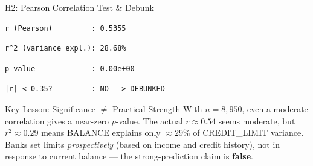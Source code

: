 \documentclass[
  ignorenonframetext,
  aspectratio=169]{beamer}
\newenvironment{Shaded}{\begin{snugshade}}{\end{snugshade}}
\newcommand{\AttributeTok}[1]{\textcolor[rgb]{0.13,0.29,0.53}{#1}}
\newcommand{\FunctionTok}[1]{\textcolor[rgb]{0.13,0.29,0.53}{\textbf{#1}}}
\newcommand{\NormalTok}[1]{#1}
\newcommand{\OtherTok}[1]{\textcolor[rgb]{0.56,0.35,0.01}{#1}}
\newcommand{\SpecialCharTok}[1]{\textcolor[rgb]{0.81,0.36,0.00}{\textbf{#1}}}
\newcommand{\StringTok}[1]{\textcolor[rgb]{0.31,0.60,0.02}{#1}}
\begin{document}
\begin{frame}[fragile]{H2: Pearson Correlation Test \& Debunk}
\protect{}\label{h2-pearson-correlation-test-debunk}
\begin{Shaded}
\end{Shaded}

\begin{verbatim}
r (Pearson)         : 0.5355
\end{verbatim}

\begin{verbatim}
r^2 (variance expl.): 28.68%
\end{verbatim}

\begin{verbatim}
p-value             : 0.00e+00
\end{verbatim}

\begin{verbatim}
|r| < 0.35?         : NO  -> DEBUNKED
\end{verbatim}

\begin{alertblock}{Key Lesson: Significance $\neq$ Practical Strength}
With $n = 8{,}950$, even a moderate correlation gives a near-zero $p$-value.
The actual $r \approx 0.54$ seems moderate, but $r^2 \approx 0.29$ means
BALANCE explains only $\approx 29\%$ of CREDIT\_LIMIT variance.
Banks set limits \textit{prospectively} (based on income and credit history),
not in response to current balance --- the strong-prediction claim is \textbf{false}.
\end{alertblock}
\end{frame}
\end{document}

